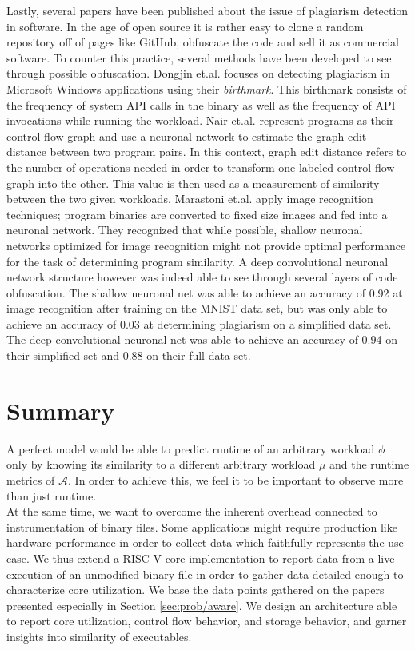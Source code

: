 \documentclass[../bachelor_paper.tex]{subfiles}
\begin{document}
Lastly, several papers have been published about the issue of plagiarism detection in software. In the age of open source it is rather easy to clone a random repository off of pages like GitHub, obfuscate the code and sell it as commercial software. To counter this practice, several methods have been developed to see through possible obfuscation. Dongjin et.al. \cite{kimMeasuringSimilarityWindows2013} focuses on detecting plagiarism in Microsoft Windows applications using their \emph{birthmark}. This birthmark consists of the frequency of system \acs{API} calls in the binary as well as the frequency of \acs{API} invocations while running the workload. Nair et.al. \cite{nairFuncGNNGraphNeural2020} represent programs as their control flow graph and use a neuronal network to estimate the graph edit distance between two program pairs. In this context, graph edit distance refers to the number of operations needed in order to transform one labeled control flow graph into the other. This value is then used as a measurement of similarity between the two given workloads. Marastoni et.al. \cite{marastoniDeepLearningApproach2018} apply image recognition techniques; program binaries are converted to fixed size images and fed into a neuronal network. They recognized that while possible, shallow neuronal networks optimized for image recognition might not provide optimal performance for the task of determining program similarity. A deep convolutional neuronal network structure however was indeed able to see through several layers of code obfuscation. The shallow neuronal net was able to achieve an accuracy of 0.92 at image recognition after training on the MNIST data set, but was only able to achieve an accuracy of 0.03 at determining plagiarism on a simplified data set. The deep convolutional neuronal net was able to achieve an accuracy of 0.94 on their simplified set and 0.88 on their full data set.

\section{Summary}
	\label{ch:theo/simi/summ}
A perfect model would be able to predict runtime of an arbitrary workload $\phi$ only by knowing its similarity to a different arbitrary workload $\mu$ and the runtime metrics of $\mathcal{A}$. In order to achieve this, we feel it to be important to observe more than just runtime.\\
At the same time, we want to overcome the inherent overhead connected to instrumentation of binary files. Some applications might require production like hardware performance in order to collect data which faithfully represents the use case. We thus extend a RISC-V core implementation to report data from a live execution of an unmodified binary file in order to gather data detailed enough to characterize core utilization. We base the data points gathered on the papers presented especially in Section \ref{sec:prob/aware}. We design an architecture able to report core utilization, control flow behavior, and storage behavior, and garner insights into similarity of executables.



\isstandalone



\fi
\end{document}
